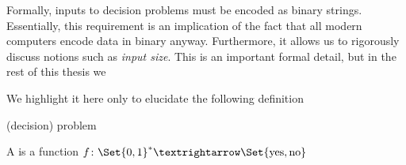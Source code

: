 Formally, inputs to decision problems must be encoded as binary strings.
Essentially, this requirement is an implication of the fact that all modern
computers encode data in binary anyway.  Furthermore, it allows us to
rigorously discuss notions such as \emph{input size}.  This is an
important formal detail, but in the rest of this thesis we 

We highlight it here only to elucidate the following definition

\begin{definition}{(decision) problem}{}

  A  is a function
  \(f\colon\Set{0,1}^*→\Set{\text{yes},\text{no}}\) 

\end{definition}





